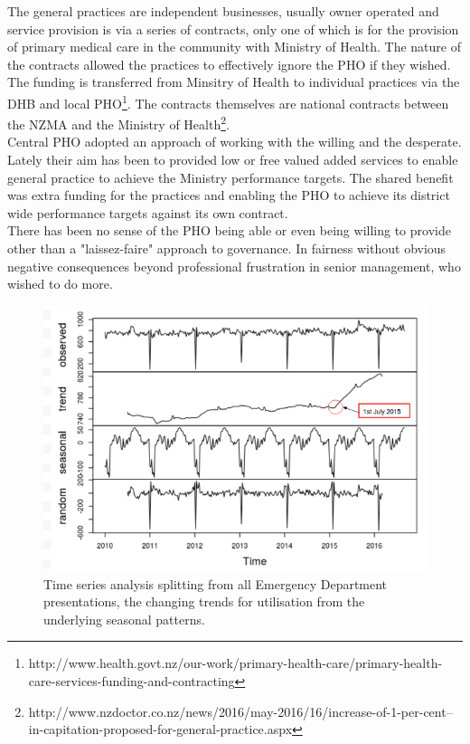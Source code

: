 \documentclass[11pt,a4paper]{article}
\begin{document}
The general practices are independent businesses, usually owner operated and service provision is via a series of contracts, only one of which is for the provision of primary medical care in the community with Ministry of Health. The nature of the contracts allowed the practices to effectively ignore the PHO if they wished. The funding is transferred from Minsitry of Health to individual practices via the DHB and local PHO\footnote{http://www.health.govt.nz/our-work/primary-health-care/primary-health-care-services-funding-and-contracting}. The contracts themselves are national contracts between the NZMA and the Ministry of Health\footnote{http://www.nzdoctor.co.nz/news/2016/may-2016/16/increase-of-1-per-cent--in-capitation-proposed-for-general-practice.aspx}.\\

Central PHO adopted an approach of working with the willing and the desperate. Lately their aim has been to provided low or free valued added services to enable general practice to achieve the Ministry performance targets. The shared benefit was extra funding for the practices and enabling the PHO to achieve its district wide performance targets against its own contract.\\

There has been no sense of the PHO being able or even being willing to provide other than a "laissez-faire" approach to governance. In fairness without obvious negative consequences beyond professional frustration in senior management, who wished to do more.\\

\begin{figure}[htp]
\centering
\includegraphics[scale=0.60]{TS_ED.png}
\caption{Time series analysis splitting from all Emergency Department presentations, the changing trends for utilisation from the underlying seasonal patterns.}
\label{Time series analysis of Emergency Department presentations}
\end{figure}
\end{document}
